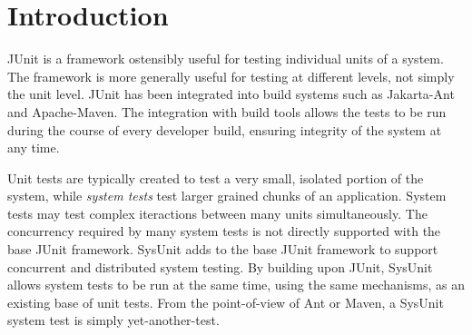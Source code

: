 \chapter{Introduction}

JUnit is a framework ostensibly useful for testing
individual units of a system.  The framework is more generally useful
for testing at different levels, not simply the unit level.  JUnit
has been integrated into build systems such as Jakarta-Ant
and Apache-Maven.  The integration with build tools
allows the tests to be run during the course of every developer
build, ensuring integrity of the system at any time.

Unit tests are
typically created to test a very small, isolated portion of the
system, while 
\emph{system tests}
test larger grained chunks of an application.  System tests may test
complex iteractions between many units simultaneously.  The
concurrency required by many system tests is not directly supported
with the base JUnit framework.  SysUnit adds to
the base JUnit framework to support concurrent and distributed
system testing.  By building upon JUnit, SysUnit allows system tests
to be run at the same time, using the same mechanisms, as an
existing base of unit tests.  From the point-of-view of Ant or
Maven, a SysUnit system test is simply yet-another-test.
